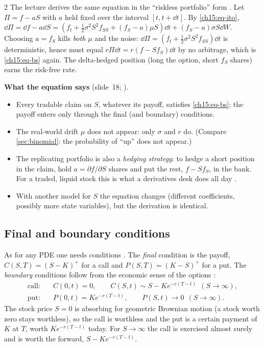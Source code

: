 \begin{paracol}{2}
The lecture derives the same equation in the ``riskless portfolio'' form . Let $\Pi=f-aS$ with $a$ held fixed over the interval
$[t,t+\dd t]$. By \eqref{ch15:eq-ito}, $\dd\Pi=\dd f-a\dd S=(f_t+\tfrac12\sigma^2S^2f_{SS}+(f_S-a)\mu S)\dd t+(f_S-a)\sigma S\dd W$.
Choosing $a=f_S$ kills \emph{both} $\mu$ and the noise: $\dd\Pi=(f_t+\tfrac12\sigma^2S^2f_{SS})\dd t$ is deterministic, hence must equal $r\Pi\dd t=r(f-Sf_S)\dd t$ by no arbitrage,
which is \eqref{ch15:eq-bs} again. The delta-hedged position (long the option, short $f_S$ shares) earns the risk-free rate.

\begin{keyformulas}
\textbf{What the equation says} (slide~18; ).
\begin{itemize}[nosep]
  \item Every tradable claim on $S$, whatever its payoff, satisfies \eqref{ch15:eq-bs}; the payoff enters only through the final (and boundary) conditions.
  \item The real-world drift $\mu$ does not appear: only $\sigma$ and $r$ do. (Compare \cref{sec:binomial}: the probability of ``up'' does not appear.)
  \item The replicating portfolio is also a \emph{hedging strategy}: to hedge a short position in the claim, hold $a=\partial f/\partial S$ shares and put the rest, $f-Sf_S$, in the bank.
        For a traded, liquid stock this is what a derivatives desk does all day .
  \item With another model for $S$ the equation changes (different coefficients, possibly more state variables), but the derivation is identical.
\end{itemize}
\end{keyformulas}

\subsection{Final and boundary conditions}
As for any PDE one needs conditions . The \emph{final} condition is the payoff, $C(S,T)=(S-K)^+$ for a call and $P(S,T)=(K-S)^+$ for a put.
The \emph{boundary} conditions follow from the economic sense of the options :
\begin{align}
  \text{call:}\quad & C(0,t)=0,\qquad C(S,t)\sim S-Ke^{-r(T-t)}\ \ (S\to\infty),\label{ch15:eq-bccall}\\
  \text{put:}\quad  & P(0,t)=Ke^{-r(T-t)},\qquad P(S,t)\to0\ \ (S\to\infty).\label{ch15:eq-bcput}
\end{align}
The stock price $S=0$ is absorbing for geometric Brownian motion (a stock worth zero stays worthless), so the call is worthless and the put is a
certain payment of $K$ at $T$, worth $Ke^{-r(T-t)}$ today. For $S\to\infty$ the call is exercised almost surely and is worth the forward, $S-Ke^{-r(T-t)}$.


\end{paracol}
